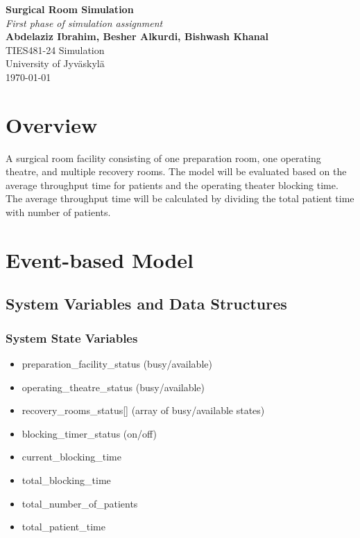 \documentclass{article}
\begin{document}
\noindent
\begin{center}
    \textbf{\LARGE Surgical Room Simulation} \\
    \textit{First phase of simulation assignment} \\
    \vspace{0.5em} %
    \textbf{Abdelaziz Ibrahim, Besher Alkurdi, Bishwash Khanal} \\
    TIES481-24 Simulation \\
    University of Jyv\"{a}skyl\"{a} \\
    \today
\end{center}

\section{Overview}
A surgical room facility consisting of one preparation room, one operating theatre, and multiple recovery rooms. The model will be evaluated based on the average 
throughput time for patients and the operating theater blocking time. The average throughput time will be calculated by dividing the total patient time with number of 
patients.

\section{Event-based Model}

\subsection{System Variables and Data Structures}

\subsubsection{System State Variables}
\begin{itemize}
    \item preparation\_facility\_status (busy/available)
    \item operating\_theatre\_status (busy/available)
    \item recovery\_rooms\_status[\hspace{1em}] (array of busy/available states)
    \item blocking\_timer\_status (on/off)
    \item current\_blocking\_time
    \item total\_blocking\_time
    \item total\_number\_of\_patients
    \item total\_patient\_time
\end{itemize}
\end{document}
